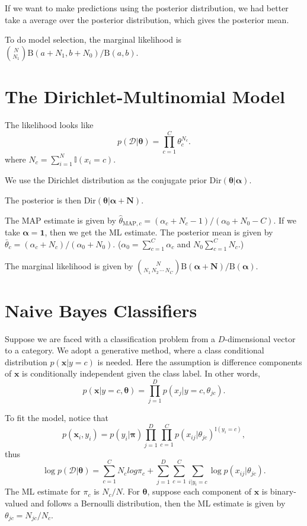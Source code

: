 \documentclass[openany]{book}
\begin{document}
If we want to make predictions using the posterior distribution, we had better take a average over the posterior distribution, which gives the posterior mean.

To do model selection, the marginal likelihood is $\binom{N}{N_1}\mathrm{B}(a+N_1,b+N_0)/\mathrm{B}(a,b)$.

\section{The Dirichlet-Multinomial Model}
The likelihood looks like
\begin{equation}
p(\mathcal{D}|\boldsymbol{\theta})=\prod_{c=1}^C\theta_c^{N_c}.
\end{equation}
where $N_c=\sum_{i=1}^N\mathbb{I}(x_i=c)$.

We use the Dirichlet distribution as the conjugate prior $\mathrm{Dir}(\boldsymbol{\theta}|\boldsymbol{\alpha})$.

The posterior is then $\mathrm{Dir}(\boldsymbol{\theta}|\boldsymbol{\alpha}+\boldsymbol{N})$.

The MAP estimate is given by $\hat{\theta}_{\mathrm{MAP},c}=(\alpha_c+N_c-1)/(\alpha_0+N_0-C)$. If we take $\boldsymbol{\alpha}=\boldsymbol{1}$, then we get the ML estimate. The posterior mean is given by $\bar{\theta}_c=(\alpha_c+N_c)/(\alpha_0+N_0)$. ($\alpha_0=\sum_{c=1}^C\alpha_c$ and $N_0\sum_{c=1}^CN_c$.)

The marginal likelihood is given by $\binom{N}{N_1\,N_2\,\cdots\,N_C}\mathrm{B}(\boldsymbol{\alpha}+\boldsymbol{N})/\mathrm{B}(\boldsymbol{\alpha})$.

\section{Naive Bayes Classifiers}
Suppose we are faced with a classification problem from a $D$-dimensional vector to a category. We adopt a generative method, where a class conditional distribution $p(\boldsymbol{x}|y=c)$ is needed. Here the assumption is difference components of $\boldsymbol{x}$ is conditionally independent given the class label. In other words,
\begin{equation}
p(\boldsymbol{x}|y=c,\boldsymbol{\theta})=\prod_{j=1}^Dp(x_j|y=c,\theta_{jc}).
\end{equation}

To fit the model, notice that
\begin{equation}
p(\boldsymbol{x}_i,y_i)=p(y_i|\boldsymbol{\pi})\prod_{j=1}^D\prod_{c=1}^Cp(x_{ij}|\theta_{jc})^{\mathbb{I}(y_i=c)},
\end{equation}
thus
\begin{equation}
\log p(\mathcal{D}|\boldsymbol{\theta})=\sum_{c=1}^CN_clog\pi_c+\sum_{j=1}^D\sum_{c=1}^C\sum_{i|y_i=c}\log p(x_{ij}|\theta_{jc}).
\end{equation}
The ML estimate for $\pi_c$ is $N_c/N$. For $\boldsymbol{\theta}$, suppose each component of $\boldsymbol{x}$ is binary-valued and follows a Bernoulli distribution, then the ML estimate is given by $\theta_{jc}=N_{jc}/N_c$.
\end{document}
